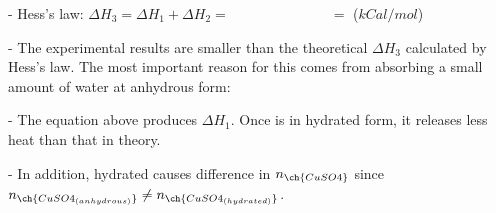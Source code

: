 \begin{enumerate}
	- Hess's law: $\Delta H_3 = \Delta H_1 + \Delta H_2 = \hspace{3cm} = $ \hspace{2cm} ($kCal/mol$)
	
	- The experimental results are smaller than the theoretical $\Delta H_3$ calculated by Hess's law. The most important reason for this comes from  absorbing a small amount of water at anhydrous form:
	
	\hspace{2cm}
	
	- The equation above produces $\Delta H_1$. Once  is in hydrated form, it releases less heat than that in theory.
	
	- In addition, hydrated  causes difference in $n_{\ch{CuSO4}}$ since $n_{\ch{CuSO4_{(anhydrous)}}} \neq n_{\ch{CuSO4_{(hydrated)}}}$.
\end{enumerate}

